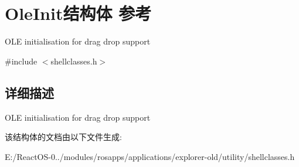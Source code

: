\hypertarget{struct_ole_init}{}\section{Ole\+Init结构体 参考}
\label{struct_ole_init}


O\+LE initialisation for drag drop support  




{\ttfamily \#include $<$shellclasses.\+h$>$}



\subsection{详细描述}
O\+LE initialisation for drag drop support 

该结构体的文档由以下文件生成\+:\begin{DoxyCompactItemize}
\item 
E\+:/\+React\+O\+S-\/0../modules/rosapps/applications/explorer-\/old/utility/shellclasses.\+h\end{DoxyCompactItemize}
